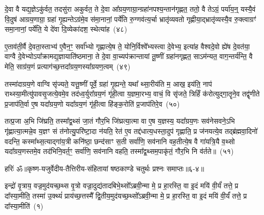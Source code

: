दे॒वा वै यद्य॒ज्ञे\-ऽकु॑र्वत॒ तदसु॑रा अकुर्वत॒ ते दे॒वा आ᳚ग्रय॒णाग्रा॒न्ग्रहा॑नपश्य॒न्तान॑गृह्णत॒ ततो॒ वै ते\-ऽग्रं॒ पर्या॑य॒न्॒ यस्यै॒वं वि॒दुष॑ आग्रय॒णाग्रा॒ ग्रहा॑ गृ॒ह्यन्ते\-ऽग्र॑मे॒व स॑मा॒नानां॒ पर्ये॑ति रु॒ग्णव॑त्य॒र्चा भ्रातृ॑व्यवतो गृह्णीया॒द्भ्रातृ॑व्यस्यै॒व रु॒क्त्वाग्रꣳ॑ समा॒नानां॒ पर्ये॑ति॒ ये दे॑वा दि॒व्येका॑\-दश॒ स्थेत्या॑ह~(४८)\ip

ए॒ताव॑ती॒र्वै दे॒वता॒स्ताभ्य॑ ए॒वैन॒ꣳ॒ सर्वा᳚भ्यो गृह्णात्ये॒ष ते॒ योनि॒र्विश्वे᳚भ्यस्त्वा दे॒वेभ्य॒ इत्या॑ह वैश्वदे॒वो ह्ये॑ष दे॒वत॑या॒ वाग्वै दे॒वेभ्यो\-ऽपा᳚क्रामद्य॒ज्ञायाति॑ष्ठमाना॒ ते दे॒वा वा॒च्यप॑क्रान्तायां तू॒ष्णीं ग्रहा॑नगृह्णत॒ सा\-ऽम॑न्यत॒ वाग॒न्तर्य॑न्ति॒ वै मेति॒ साग्र॑य॒णं प्रत्याग॑च्छ॒त्तदा᳚ग्रय॒णस्या᳚ग्रयण॒त्वम्~(४९)\ip

तस्मा॑दाग्रय॒णे वाग्वि सृ॑ज्यते॒ यत्तू॒ष्णीं पूर्वे॒ ग्रहा॑ गृ॒ह्यन्ते॒ यथा᳚ थ्सा॒रीय॑ति म॒ आख॒ इय॑ति॒ नाप॑ राथ्स्या॒मीत्यु॑पावसृ॒जत्ये॒वमे॒व तद॑ध्व॒र्युरा᳚ग्रय॒णं गृ॑ही॒त्वा य॒ज्ञमा॒रभ्य॒ वाचं॒ वि सृ॑जते॒ त्रिर्\mbox{}हिं क॑रोत्युद्गा॒तॄने॒व तद्वृ॑णीते प्र॒जा\-प॑ति॒र्वा ए॒ष यदा᳚ग्रय॒णो यदा᳚ग्रय॒णं गृ॑ही॒त्वा हि॑ङ्क॒रोति॑ प्र॒जा\-प॑तिरे॒व~(५०)\ip

तत्प्र॒जा अ॒भि जि॑घ्रति॒ तस्मा᳚द्\-व॒थ्सं जा॒तं गौर॒भि जि॑घ्रत्या॒त्मा वा ए॒ष य॒ज्ञस्य॒ यदा᳚ग्रय॒णः सव॑नेसवने॒\-ऽभि गृ॑ह्णात्या॒त्मन्ने॒व य॒ज्ञꣳ सं त॑नोत्यु॒परि॑ष्टा॒दा न॑यति॒ रेत॑ ए॒व तद्द॑धात्य॒धस्ता॒दुप॑ गृह्णाति॒ प्र ज॑नयत्ये॒व तद्ब्र॑ह्मवा॒दिनो॑ वदन्ति॒ कस्मा᳚थ्स॒त्याद्गा॑य॒त्री कनि॑ष्ठा॒ छन्द॑साꣳ स॒ती सर्वा॑णि॒ सव॑नानि वह॒तीत्ये॒ष वै गा॑यत्रि॒यै व॒थ्सो यदा᳚ग्रय॒णस्तमे॒व तद॑भिनि॒वर्त॒ꣳ॒ सर्वा॑णि॒ सव॑नानि वहति॒ तस्मा᳚द्\-व॒थ्सम॒पाकृ॑तं॒ गौर॒भि नि व॑र्तते॥~(५१)\ip

{\anuvakamend[{आ॒हा॒ग्र॒य॒ण॒त्वं प्र॒जा\-प॑तिरे॒वेति॑ विꣳश॒तिश्च॑}]}%

{हरिः॑ ॐ}{॥कृष्ण-यजुर्वेदीय-तैत्तिरीय-संहितायां षष्ठकाण्डे चतुर्थः प्रश्नः समाप्तः॥६-४॥}



\setcounter{anuvakam}{0}
इन्द्रो॑ वृ॒त्राय॒ वज्र॒मुद॑यच्छ॒थ्स वृ॒त्रो वज्रा॒दुद्य॑तादबिभे॒थ्सो᳚\-ऽब्रवी॒न्मा मे॒ प्र हा॒रस्ति॒ वा इ॒दं मयि॑ वी॒र्यं॑ तत्ते॒ प्र दा᳚स्या॒मीति॒ तस्मा॑ उ॒क्थ्यं॑ प्राय॑च्छ॒त्तस्मै᳚ द्वि॒तीय॒मुद॑यच्छ॒थ्सो᳚\-ऽब्रवी॒न्मा मे॒ प्र हा॒रस्ति॒ वा इ॒दं मयि॑ वी॒र्यं॑ तत्ते॒ प्र दा᳚स्या॒मीति॑~(१)\ip

